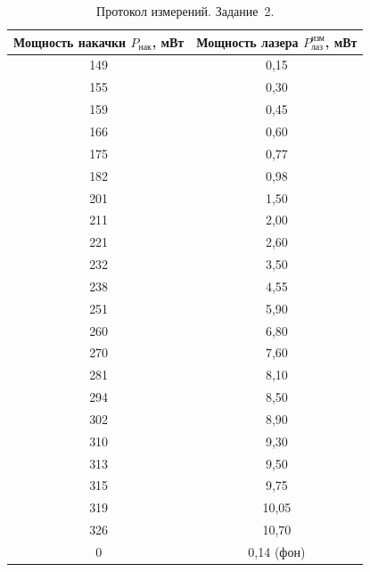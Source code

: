 \documentclass[12pt,a4paper]{article}
\begin{document}
\begin{table}[H]
  \centering
  \begin{tabular}{cc}
    \toprule
    Мощность накачки $P_\text{нак}$, мВт & Мощность лазера $P_\text{лаз}^\text{изм}$, мВт \\
    \midrule
    149 & 0,15 \\
    155 & 0,30 \\
    159 & 0,45 \\
    166 & 0,60 \\
    175 & 0,77 \\
    182 & 0,98 \\
    201 & 1,50 \\
    211 & 2,00 \\
    221 & 2,60 \\
    232 & 3,50 \\
    238 & 4,55 \\
    251 & 5,90 \\
    260 & 6,80 \\
    270 & 7,60 \\
    281 & 8,10 \\
    294 & 8,50 \\
    302 & 8,90 \\
    310 & 9,30 \\
    313 & 9,50 \\
    315 & 9,75 \\
    319 & 10,05 \\
    326 & 10,70 \\
    \midrule
    0   & 0,14 (фон) \\
    \bottomrule
  \end{tabular}
  \caption{Протокол измерений. Задание~2.}
\end{table}
\end{document}
